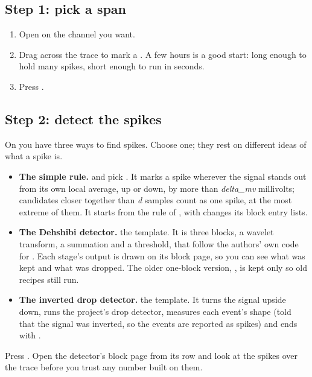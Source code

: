 \subsection*{Step 1: pick a span}
\begin{enumerate}
\item Open  on the channel you want.
\item Drag across the trace to mark a . A few hours is a good start: long
  enough to hold many spikes, short enough to run in seconds.
\item Press .
\end{enumerate}

\subsection*{Step 2: detect the spikes}
On  you have three ways to find spikes. Choose one; they rest on
different ideas of what a spike is.
\begin{itemize}
\item \textbf{The simple rule.}  and pick . It
  marks a spike wherever the signal stands out from its own local average, up or down, by
  more than \emph{delta\_mv} millivolts; candidates closer together than \emph{d} samples
  count as one spike, at the most extreme of them. It starts from the rule of
  \citet{adamatzky2023multiscalar}, with changes its block entry lists.
\item \textbf{The Dehshibi detector.}  the  template. It is
  three blocks, a wavelet transform, a summation and a threshold, that follow the authors'
  own code for \citet{dehshibi2021electrical}. Each stage's output is drawn on its block page,
  so you can see what was kept and what was dropped. The older one-block version,
  , is kept only so old recipes still run.
\item \textbf{The inverted drop detector.}  the 
  template. It turns the signal upside down, runs the project's drop detector, measures each
  event's shape (told that the signal was inverted, so the events are reported as spikes) and
  ends with .
\end{itemize}
Press . Open the detector's block page from its row and look at the spikes over
the trace before you trust any number built on them.

